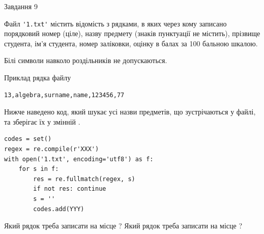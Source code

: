 \documentclass[12pt, ukrainian]{article}
\def\code#1{\Verb!#1!}
\begin{document}
{\begin{minipage}[t]{8.0cm}
\end{minipage}

               
{\begin{center}Завдання {9}\end{center}}
\vspace{-4mm}
Файл \code{'1.txt'} містить відомість з рядками, в яких через кому записано поряд\-ковий номер (ціле), назву предмету (знаків пунктуації не містить), прізвище студента, ім'я студента, номер заліковки, оцінку в балах за 100 бальною шкалою.

Білі символи навколо роздільників не допускаються.

Приклад рядка файлу



\begin{verbatim}
13,algebra,surname,name,123456,77
\end{verbatim}


Нижче наведено код, який шукає усі назви предметів, що зустрічаються у файлі, та зберігає їх у змінній .



\begin{verbatim}
codes = set()
regex = re.compile(r'XXX')
with open('1.txt', encoding='utf8') as f:
    for s in f:
        res = re.fullmatch(regex, s)
        if not res: continue
        s = ''
        codes.add(YYY)
\end{verbatim}



Який рядок треба записати на місце  ?
Який рядок треба записати на місце  ?\par

}
\newpage
\end{document}
